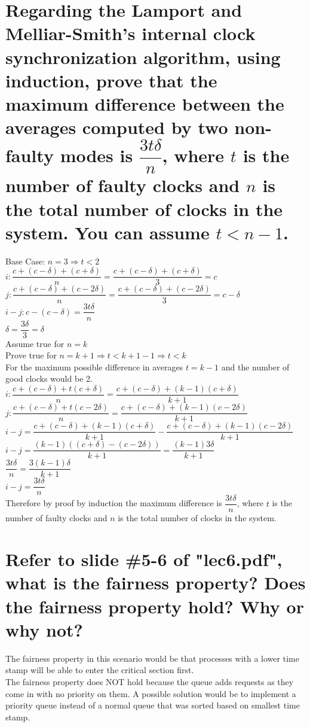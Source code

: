 \documentclass[times]{article}
\begin{document}
	

	\section{Regarding the Lamport and Melliar-Smith's internal clock synchronization algorithm, using induction, prove that the maximum difference between the averages computed by two non-faulty modes is $\dfrac{3t \delta}{n}$, where $t$ is the number of faulty clocks and $n$ is the total number of clocks in the system. You can assume $t < n-1$.}%
		Base Case: $n=3 \Rightarrow t < 2$\\
		$i: \dfrac{c+(c-\delta) + (c+ \delta) }{n}=\dfrac{c+(c-\delta) + (c+ \delta) }{3}=c$\\
		$j: \dfrac{c+(c-\delta) + (c- 2\delta) }{n}=\dfrac{c+(c-\delta) + (c-2 \delta) }{3}=c-\delta$\\
		$i-j:c-(c-\delta)=\dfrac{3t\delta}{n}$\\
		$\delta=\dfrac{3\delta}{3}=\delta$\\
		Assume true for $n=k$\\
		Prove true for $n=k+1 \Rightarrow t<k+1-1\Rightarrow  t<k $\\
		For the maximum possible difference in averages $t=k-1$ and the number of good clocks would be 2.\\
		$i: \dfrac{c+(c-\delta)+t(c+\delta)}{n}=\dfrac{c+(c-\delta)+(k-1)(c+\delta)}{k+1}$\\
		$j: \dfrac{c+(c-\delta)+t(c-2\delta)}{n}=\dfrac{c+(c-\delta)+(k-1)(c-2\delta)}{k+1}$\\
		$i-j=\dfrac{c+(c-\delta)+(k-1)(c+\delta)}{k+1}-\dfrac{c+(c-\delta)+(k-1)(c-2\delta)}{k+1}$\\
		$i-j=\dfrac{(k-1)((c+\delta)-(c-2\delta))}{k+1}=\dfrac{(k-1)3\delta}{k+1}$\\
		$\dfrac{3t\delta}{n}=\dfrac{3(k-1)\delta}{k+1}$\\
		$i-j=\dfrac{3t\delta}{n}$\\
		Therefore by proof by induction the maximum difference is $\dfrac{3t\delta}{n}$, where $t$ is the number of faulty clocks and $n$ is the total number of clocks in the system.


	\section{Refer to slide \#5-6 of "lec6.pdf", what is the fairness property? Does the fairness property hold? Why or why not?}%
	The fairness property in this scenario would be that processes with a lower time stamp will be able to enter the critical section first. \\
	The fairness property does NOT hold because the queue adds requests as they come in with no priority on them. A possible solution would be to implement a priority queue instead of a normal queue that was sorted based on smallest time stamp. \\
	

	
	
		
\end{document}
